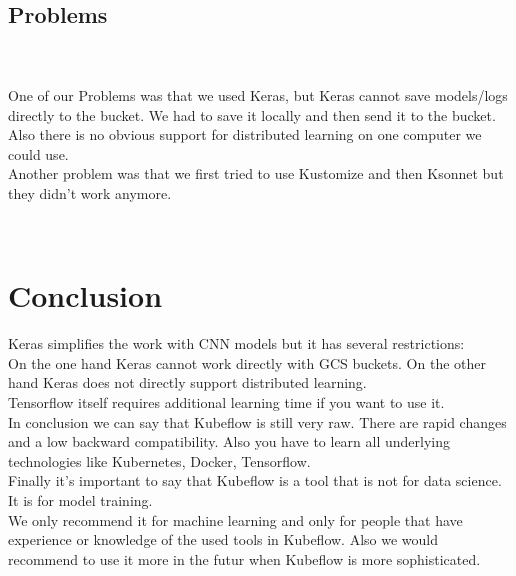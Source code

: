 \documentclass[
	12pt, %
]{fphw}
\begin{document}
\ \\ 
\subsection*{Problems}
\ \\  \ \\
\noindent One of our Problems was that we used Keras, but Keras cannot save models/logs directly to the bucket. We had to save it locally and then send it to the bucket. \\
Also there is no obvious support for distributed learning on one computer we could use. \\

\noindent Another problem was that we first tried to use Kustomize and then Ksonnet but they didn't work anymore.

\ \\
\section{Conclusion}

\noindent Keras simplifies the work with CNN models but it has several restrictions: \\
On the one hand Keras cannot work directly with GCS buckets. On the other hand Keras does not directly support distributed learning. \\

\noindent Tensorflow itself requires additional learning time if you want to use it.\\

\noindent In conclusion we can say that Kubeflow is still very raw. There are rapid changes and a low backward compatibility. Also you have to learn all underlying technologies like Kubernetes, Docker, Tensorflow.\\
Finally it's important to say that Kubeflow is a tool that is not for data science. It is for model training. \\

\noindent We only recommend it for machine learning and only for people that have experience or knowledge of the used tools in Kubeflow. Also we would recommend to use it more in the futur when Kubeflow is more sophisticated.
\ \\
{}

\end{document}
